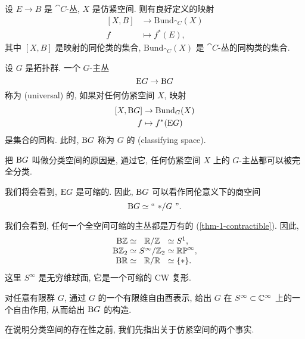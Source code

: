 设 $E \to B$ 是 $\cat{C}$-丛, $X$ 是仿紧空间. 
则有良好定义的映射
\[ \begin{aligned}{}
    [X, B] & \to \mathrm{Bund}_{\cat{C}} (X) \\
    f & \mapsto f^*(E),
\end{aligned} \]
其中 $[X, B]$ 是映射的同伦类的集合, 
$\mathrm{Bund}_{\cat{C}} (X)$ 是 $\cat{C}$-丛的同构类的集合. 

\begin{definition}
    设 $G$ 是拓扑群. 一个 $G$-主丛
    \[ \mathrm{E} G \to \mathrm{B} G \]
    称为 (universal) 的, 如果对任何仿紧空间 $X$, 映射
    \[ \begin{aligned}{}
        [X, \mathrm{B} G] & \to \mathrm{Bund}_G (X) \\
        f & \mapsto f^*(\mathrm{E} G)
    \end{aligned} \]
    是集合的同构. 
    此时, $\mathrm{B} G$ 称为 $G$ 的 (classifying space). 
\end{definition}

把 $\mathrm{B} G$ 叫做分类空间的原因是, 通过它, 
任何仿紧空间 $X$ 上的 $G$-主丛都可以被完全分类. 

我们将会看到, $\mathrm{E} G$ 是可缩的. 
因此, $\mathrm{B} G$ 可以看作同伦意义下的商空间
\[ \mathrm{B} G \simeq \text{``}\ {*} / G\ \text{''}. \]

\begin{example}
    我们会看到, 任何一个全空间可缩的主丛都是万有的 (\ref{thm-1-contractible}). 因此, 
    \[ \arraycolsep=.16em
    \begin{array}{rcl}
        \upB\bbZ \simeq & \bbR / \bbZ & \simeq S^1, \\
        \upB\bbZ_2 \simeq & S^\infty / \bbZ_2 & \simeq \mathbb{RP}^\infty, \\
        \upB\bbR \simeq & \bbR / \bbR & \simeq \{*\}.
    \end{array} \]
    这里 $S^\infty$ 是无穷维球面, 它是一个可缩的 CW 复形. \varqed
\end{example}

\begin{exercise}
    对任意有限群 $G$, 
    通过 $G$ 的一个有限维自由酉表示, 
    给出 $G$ 在 $S^\infty \subset \mathbb{C}^\infty$ 上的一个自由作用, 
    从而给出 $\mathrm{B} G$ 的构造. \varqed
\end{exercise}

在说明分类空间的存在性之前, 我们先指出关于仿紧空间的两个事实. 

